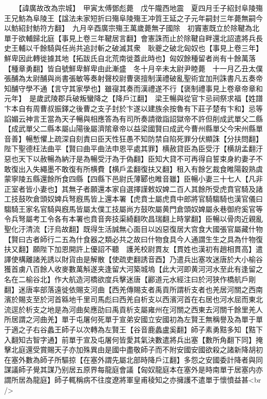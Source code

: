 　　【諱廣故改為宗城】　甲寅太傅鄧彪薨　戊午隴西地震　夏四月壬子紹封阜陵殤王兄魴為阜陵王【諡法未家短折曰殤阜陵殤王冲質王延之子元年嗣封三年薨無嗣今以魴紹封魴符方翻】　九月辛酉廣宗殤王萬歲薨無子國除　初竇憲既立於除鞬為北單于欲輔歸北庭【事見上卷三年鞬居言翻】會憲誅而止於除鞬自畔還北詔遣將兵長史王輔以千餘騎與任尚共追討斬之破滅其衆　耿夔之破北匈奴也【事見上卷三年】鮮卑因此轉徙據其地【拓跋氏自北荒南徙蓋此時也】匈奴餘種留者尚有十餘萬落【種章勇翻】皆自號鮮卑鮮卑由此漸盛　冬十月辛未太尉尹睦薨　十一月乙丑太僕張酺為太尉酺與尚書張敏等奏射聲校尉曹褒擅制漢禮破亂聖術宜加刑誅書凡五奏帝知酺守學不通【言守其家學也】雖寑其奏而漢禮遂不行【褒制禮事見上卷章帝章和元年】　是歲武陵郡兵破叛蠻降之【降戶江翻】　梁王暢與從官卞忌祠祭求福【姓譜卞本自有周曹叔振鐸之後曹之支子封於卞遂以建族余按魯有下莊子楚有卞和】忌等諂媚云神言王當為天子暢與相應答為有司所奏請徵詣詔獄帝不許但削成武單父二縣【成武單父二縣本屬山陽後屬濟隂章帝以益梁國賢曰成武今曹州縣單父今宋州縣單音善】暢慙懼上疏深自刻責曰臣天性狂愚不知防禁自陷死罪分伏顯誅【分扶問翻】陛下聖德枉法曲平【賢曰曲平曲法申恩平處其罪】横赦貸臣為臣受汙【横胡孟翻汙惡也天下以赦暢為納汙是為暢受汙為于偽翻】臣知大貸不可再得自誓束身約妻子不敢復出入失繩墨不敢復有所横費【横戶孟翻復扶又翻】租入有餘乞裁食睢陽穀熟虞蒙寧陵五縣還餘所食四縣【四縣下邑尉氏薄郾也睢音雖】臣暢小妻三十七人【凡非正室者皆小妻也】其無子者願還本家自選擇謹敕奴婢二百人其餘所受虎賁官騎及諸工技鼓吹倉頭奴婢兵弩廐馬皆上還本署【虎賁士屬虎賁中郎將官騎騶騎也漢官儀曰騶騎王家名官騎與廐馬皆屬太僕工技屬尚方鼓吹屬黄門倉頭奴婢屬永巷御府奚官等令兵弩屬考工令各有本署也賁音奔技渠綺翻吹昌瑞翻上時掌翻】臣暢以骨肉近親亂聖化汙清流【汙烏故翻】既得生活誠無心面目以凶惡復居大宫食大國張官屬藏什物【賢曰古者師行二五為什食器之類必共之故曰什物食具今人通謂生生之具為什物復扶又翻】願陛下加恩開許上優詔不聽　護羌校尉貫友【貫姓也漢初有趙相貫高】遣譯使構離諸羌誘以財貨由是解散【使疏吏翻誘音酉】乃遣兵出塞攻迷唐於大小榆谷獲首虜八百餘人收麥數萬斛遂夹逢留大河築城塢【此大河即黄河河水至此有逢留之名在二榆谷北】作大航造河橋欲度兵擊迷唐【酈道元水經注曰於河狭作橋航戶剛翻】迷唐率部落遠徙依賜支河曲【西羌傳賜支者禹貢所謂析支者也羌居河關之西南濱於賜支至於河首緜地千里司馬彪曰西羌自析支以西濱河首在右居也河水屈而東北流逕於析支之地是為河曲矣應劭曰禹貢析支屬雍州在河關之西東去河關千餘里羌人所居謂之河曲羌】單于屯屠何死單于宣弟安國立安國初為左賢王無稱譽及為單于單于適之子右谷蠡王師子以次轉為左賢王【谷音鹿蠡盧奚翻】師子素勇黠多知【黠下入翻知古智字通】前單于宣及屯屠何皆愛其氣決數遣將兵出塞【數所角翻下同】掩擊北庭還受賞賜天子亦加殊異由是國中盡敬師子而不附安國安國欲殺之諸新降胡初在塞外數為師子所驅掠【在塞外謂先屬北部時降戶江翻】多怨之安國委計降者與同謀議師子覺其謀乃别居五原界每龍庭會議【匈奴龍庭本在塞外是時南單于居塞内亦謂所居為龍庭】師子輒稱病不往度遼將軍皇甫稜知之亦擁護不遣單于懷憤益甚<br />
